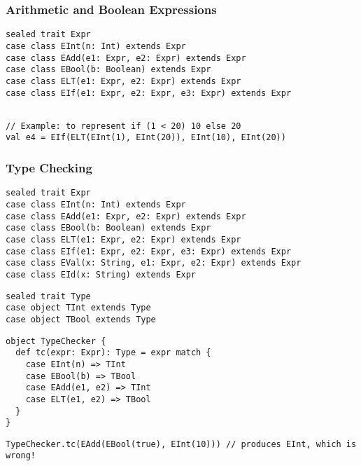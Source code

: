 \documentclass[8pt,pdf]{beamer}
\begin{document}
\begin{frame}[fragile]
\frametitle{Arithmetic and Boolean Expressions}

\begin{lstlisting}
sealed trait Expr
case class EInt(n: Int) extends Expr
case class EAdd(e1: Expr, e2: Expr) extends Expr
case class EBool(b: Boolean) extends Expr
case class ELT(e1: Expr, e2: Expr) extends Expr
case class EIf(e1: Expr, e2: Expr, e3: Expr) extends Expr
\end{lstlisting}
\pause
\begin{lstlisting}

// Example: to represent if (1 < 20) 10 else 20
val e4 = EIf(ELT(EInt(1), EInt(20)), EInt(10), EInt(20))
\end{lstlisting}

\end{frame}

\begin{frame}[fragile]
\frametitle{Type Checking}

\begin{lstlisting}
sealed trait Expr
case class EInt(n: Int) extends Expr
case class EAdd(e1: Expr, e2: Expr) extends Expr
case class EBool(b: Boolean) extends Expr
case class ELT(e1: Expr, e2: Expr) extends Expr
case class EIf(e1: Expr, e2: Expr, e3: Expr) extends Expr
case class EVal(x: String, e1: Expr, e2: Expr) extends Expr
case class EId(x: String) extends Expr
\end{lstlisting}
\pause
\begin{lstlisting}
sealed trait Type
case object TInt extends Type
case object TBool extends Type
\end{lstlisting}
\pause
\begin{lstlisting}
object TypeChecker {
  def tc(expr: Expr): Type = expr match {
    case EInt(n) => TInt
    case EBool(b) => TBool
    case EAdd(e1, e2) => TInt
    case ELT(e1, e2) => TBool
  }
}
\end{lstlisting}

\pause
\begin{lstlisting}
TypeChecker.tc(EAdd(EBool(true), EInt(10))) // produces EInt, which is wrong!
\end{lstlisting}
\end{frame}
\end{document}
